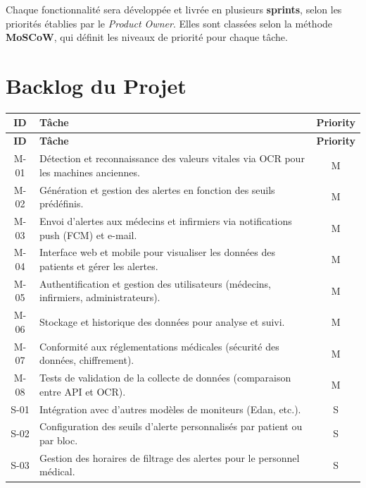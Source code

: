 Chaque fonctionnalité sera développée et livrée en plusieurs \textbf{sprints}, selon les priorités établies par le \textit{Product Owner}. Elles sont classées selon la méthode \textbf{MoSCoW}, qui définit les niveaux de priorité pour chaque tâche.

\section*{Backlog du Projet}

\begin{longtable}{|c|p{9cm}|c|}
    \hline
    \textbf{ID} & \textbf{Tâche} & \textbf{Priority} \\
    \hline
    \endfirsthead
    \hline
    \textbf{ID} & \textbf{Tâche} & \textbf{Priority} \\
    \hline
    \endhead
    \endfoot
    M-01& Détection et reconnaissance des valeurs vitales via OCR pour les machines anciennes. & M \\
    \hline
    M-02 & Génération et gestion des alertes en fonction des seuils prédéfinis. & M \\
    \hline
    M-03 & Envoi d’alertes aux médecins et infirmiers via notifications push (FCM) et e-mail. & M \\
    \hline
    M-04 & Interface web et mobile pour visualiser les données des patients et gérer les alertes. & M \\
    \hline
    M-05 & Authentification et gestion des utilisateurs (médecins, infirmiers, administrateurs). & M \\
    \hline
    M-06 & Stockage et historique des données pour analyse et suivi. & M \\
    \hline
    M-07 & Conformité aux réglementations médicales (sécurité des données, chiffrement). & M \\
    \hline
    M-08 & Tests de validation de la collecte de données (comparaison entre API et OCR). & M \\
    \hline
    S-01 & Intégration avec d’autres modèles de moniteurs (Edan, etc.). & S \\
    \hline
    S-02 & Configuration des seuils d’alerte personnalisés par patient ou par bloc. & S \\
    \hline
    S-03 & Gestion des horaires de filtrage des alertes pour le personnel médical. & S \\

\end{longtable}
